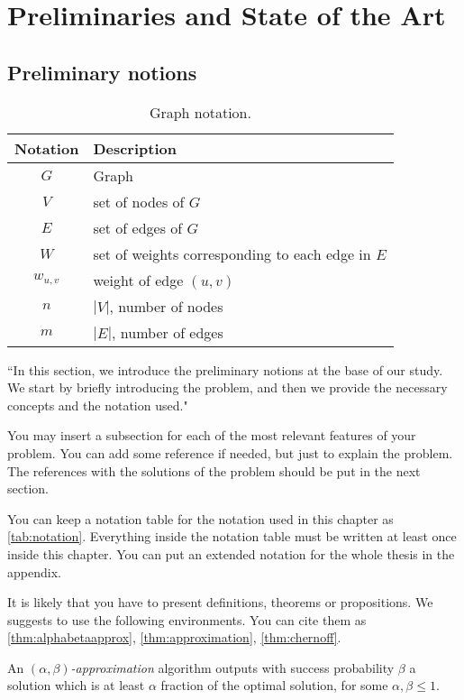 \chapter{Preliminaries and State of the Art}
\label{ch:preliminaries_and_sota}

\section{Preliminary notions}
\label{sec:preliminaries}

\begin{table}[!ht]
\centering
\begin{tabular}{c l} \hline
\textbf{Notation}&\textbf{Description} \\ \hline
$G$&Graph\\
$V$&set of nodes of $G$\\
$E$&set of edges of $G$\\
$W$&set of weights corresponding to each edge in $E$\\
$w_{u,v}$&weight of edge $(u,v)$\\
$n$&$|V|$, number of nodes\\
$m$&$|E|$, number of edges\\
\hline
\end{tabular}
\caption{Graph notation.}
\label{tab:notation}
\end{table}

``In this section, we introduce the preliminary notions at the base of our study. We start by briefly introducing the problem, and then we provide the necessary concepts and the notation used."

You may insert a subsection for each of the most relevant features of your problem. You can add some reference if needed, but just to explain the problem. The references with the solutions of the problem should be put in the next section.

You can keep a notation table for the notation used in this chapter as \autoref{tab:notation}. Everything inside the notation table must be written at least once inside this chapter. You can put an extended notation for the whole thesis in the appendix.

It is likely that you have to present definitions, theorems or propositions. We suggests to use the following environments. You can cite them as \autoref{thm:alphabetaapprox}, \autoref{thm:approximation}, \autoref{thm:chernoff}.

\begin{definition}
\label{thm:alphabetaapprox}
An $(\alpha, \beta)$\textit{-approximation} algorithm outputs with success probability $\beta$ a solution which is at least $\alpha$ fraction of the optimal solution, for some $\alpha, \beta \leq 1$.
\end{definition}


